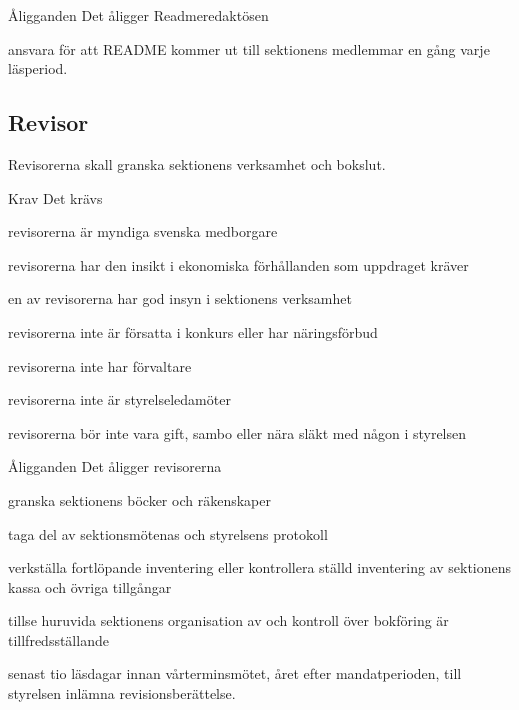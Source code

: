 \documentclass[pdfbookmarks,a4paper,11pt]{article}
\newcommand{\funktionar}[1]{%
  \subsection*{#1}\par
  \addcontentsline{toc}{subsection}{#1}}
\newlength{\itemcollength}
\newenvironment{reglemlista}{%
  \begin{list}{}{%
      \setlength{\labelwidth}{\itemcollength}%
      \setlength{\leftmargin}{\labelwidth + \labelsep}%
      \renewcommand{\makelabel}[1]{%
        \raisebox{0pt}[1ex][0pt]{%
          \makebox[\labelwidth][l]{%
            \parbox[t]{\itemcollength}{%
              \raggedright\hspace{0pt}##1}}}\hfill}%
      }}{%
  \end{list}}
\begin{document}
  \begin{reglemlista}

    \item[Åligganden]
      Det åligger Readmeredaktösen
      \begin{attlista}
        \item  ansvara för att README kommer ut till sektionens medlemmar en gång varje läsperiod.
      \end{attlista}

  \end{reglemlista}

\funktionar{Revisor}
  Revisorerna skall granska sektionens verksamhet och bokslut.

  \begin{reglemlista}

    \item[Krav]
      Det krävs
      \begin{attlista}
        \item revisorerna är myndiga svenska medborgare
        \item revisorerna har den insikt i ekonomiska förhållanden som uppdraget kräver
        \item en av revisorerna har god insyn i sektionens verksamhet
        \item revisorerna inte är försatta i konkurs eller har näringsförbud
        \item revisorerna inte har förvaltare
        \item revisorerna inte är styrelseledamöter
        \item revisorerna bör inte vara gift, sambo eller nära släkt med någon i styrelsen
      \end{attlista}

    \item[Åligganden]
      Det åligger revisorerna
      \begin{attlista}
        \item granska sektionens böcker och räkenskaper
        \item taga del av sektionsmötenas och styrelsens protokoll
        \item verkställa fortlöpande inventering eller kontrollera ställd inventering av sektionens kassa och övriga tillgångar
        \item tillse huruvida sektionens organisation av och kontroll över bokföring är tillfredsställande
        \item senast tio läsdagar innan vårterminsmötet, året
efter mandatperioden, till styrelsen inlämna revisionsberättelse.
      \end{attlista}


\end{reglemlista}
\end{document}

